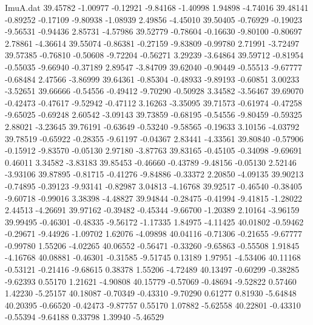 \begin{filecontents}{ImuA.dat}
  39.45782   -1.00977   -0.12921   -9.84168   -1.40998    1.94898   -4.74016
  39.48141   -0.89252   -0.17109   -9.80938   -1.08939    2.49856   -4.45010
  39.50405   -0.76929   -0.19023   -9.56531   -0.94436    2.85731   -4.57986
  39.52779   -0.78604   -0.16630   -9.80100   -0.80697    2.78861   -4.36614
  39.55074   -0.86381   -0.27159   -9.83809   -0.99780    2.71991   -3.72497
  39.57385   -0.76810   -0.50608   -9.72204   -0.56271    3.29239   -3.64864
  39.59712   -0.81954   -0.55035   -9.66940   -0.37189    2.89547   -3.84709
  39.62040   -0.90449   -0.55513   -9.67777   -0.68484    2.47566   -3.86999
  39.64361   -0.85304   -0.48933   -9.89193   -0.60851    3.00233   -3.52651
  39.66666   -0.54556   -0.49412   -9.70290   -0.50928    3.34582   -3.56467
  39.69070   -0.42473   -0.47617   -9.52942   -0.47112    3.16263   -3.35095
  39.71573   -0.61974   -0.47258   -9.65025   -0.69248    2.60542   -3.09143
  39.73859   -0.68195   -0.54556   -9.80459   -0.59325    2.88021   -3.23645
  39.76191   -0.63649   -0.53240   -9.58565   -0.19633    3.10156   -4.03792
  39.78519   -0.65922   -0.28355   -9.61197   -0.04367    2.83441   -4.33561
  39.80840   -0.57906   -0.15912   -9.83570   -0.05130    2.97180   -3.87763
  39.83165   -0.45105   -0.34098   -9.69691    0.46011    3.34582   -3.83183
  39.85453   -0.46660   -0.43789   -9.48156   -0.05130    2.52146   -3.93106
  39.87895   -0.81715   -0.41276   -9.84886   -0.33372    2.20850   -4.09135
  39.90213   -0.74895   -0.39123   -9.93141   -0.82987    3.04813   -4.16768
  39.92517   -0.46540   -0.38405   -9.60718   -0.99016    3.38398   -4.48827
  39.94844   -0.28475   -0.41994   -9.41815   -1.28022    2.44513   -4.26691
  39.97162   -0.39482   -0.45344   -9.66700   -1.20389    2.10164   -3.96159
  39.99495   -0.46301   -0.48335   -9.56172   -1.17335    1.84975   -4.11425
  40.01802   -0.59462   -0.29671   -9.44926   -1.09702    1.62076   -4.09898
  40.04116   -0.71306   -0.21655   -9.67777   -0.99780    1.55206   -4.02265
  40.06552   -0.56471   -0.33260   -9.65863   -0.55508    1.91845   -4.16768
  40.08881   -0.46301   -0.31585   -9.51745    0.13189    1.97951   -4.53406
  40.11168   -0.53121   -0.21416   -9.68615    0.38378    1.55206   -4.72489
  40.13497   -0.60299   -0.38285   -9.62393    0.55170    1.21621   -4.90808
  40.15779   -0.57069   -0.48694   -9.52822    0.57460    1.42230   -5.25157
  40.18087   -0.70349   -0.43310   -9.70290    0.61277    0.81930   -5.64848
  40.20395   -0.66520   -0.42473   -9.87757    0.55170    1.07882   -5.62558
  40.22801   -0.43310   -0.55394   -9.64188    0.33798    1.39940   -5.46529

\end{filecontents}
